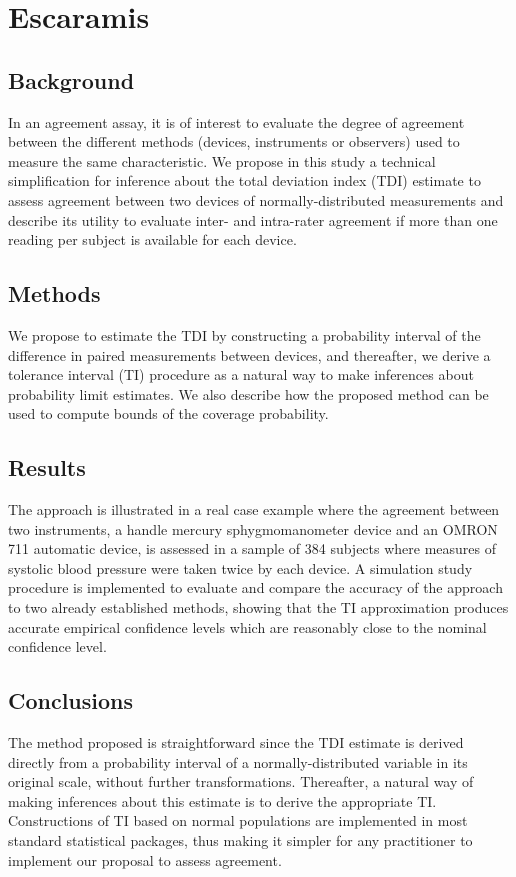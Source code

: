 \documentclass[12pt, a4paper]{report}
\begin{document}
\section{Escaramis}
\subsection{Background}
In an agreement assay, it is of interest to evaluate the degree of agreement between the different methods (devices, instruments or observers) used to measure the same characteristic. We propose in this study a technical simplification for inference about the total deviation index (TDI) estimate to assess agreement between two devices of normally-distributed measurements and describe its utility to evaluate inter- and intra-rater agreement if more than one reading per subject is available for each device.

\subsection{Methods}
We propose to estimate the TDI by constructing a probability interval of the difference in paired measurements between devices, and thereafter, we derive a tolerance interval (TI) procedure as a natural way to make inferences about probability limit estimates. We also describe how the proposed method can be used to compute bounds of the coverage probability.

\subsection{Results}
The approach is illustrated in a real case example where the agreement between two instruments, a handle mercury sphygmomanometer device and an OMRON 711 automatic device, is assessed in a sample of 384 subjects where measures of systolic blood pressure were taken twice by each device. A simulation study procedure is implemented to evaluate and compare the accuracy of the approach to two already established methods, showing that the TI approximation produces accurate empirical confidence levels which are reasonably close to the nominal confidence level.

\subsection{Conclusions}
The method proposed is straightforward since the TDI estimate is derived directly from a probability interval of a normally-distributed variable in its original scale, without further transformations. Thereafter, a natural way of making inferences about this estimate is to derive the appropriate TI. Constructions of TI based on normal populations are implemented in most standard statistical packages, thus making it simpler for any practitioner to implement our proposal to assess agreement.
\end{document}

